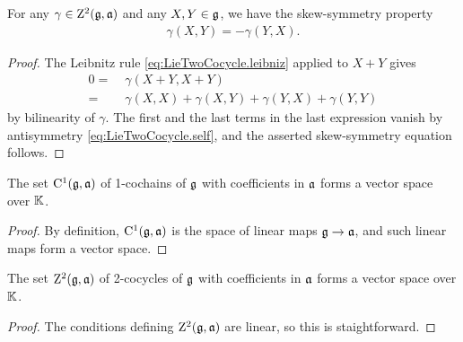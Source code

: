 \begin{lemma}
  \label{lem:LieTwoCocycle_skew_symmetry}
  \leanok
  For any $\gamma \in \mathrm{Z}^2(\mathfrak{g},\mathfrak{a})$ and any $X,Y \in \mathfrak{g}$,
  we have the skew-symmetry property
  \begin{align*}
    \gamma(X,Y) = - \gamma(Y,X) .
  \end{align*}
\end{lemma}
\begin{proof}
  \leanok
  The Leibnitz rule \eqref{eq:LieTwoCocycle.leibniz}
  applied to $X+Y$ gives
  \begin{align*}
    0 = \; & \gamma(X+Y,X+Y) \\
      = \; & \gamma(X,X) + \gamma(X,Y) + \gamma(Y,X) + \gamma(Y,Y)
  \end{align*}
  by bilinearity of $\gamma$. The first and the last terms
  in the last expression vanish by antisymmetry \eqref{eq:LieTwoCocycle.self},
  and the asserted skew-symmetry equation follows.
\end{proof}

\begin{lemma}
  \label{lem:LieOneCocycle_vectorSpace}
  \leanok
  The set $\mathrm{C}^1(\mathfrak{g}, \mathfrak{a})$ of 1-cochains of $\mathfrak{g}$ with
  coefficients in $\mathfrak{a}$ forms a vector space over $\mathbb{K}$.
\end{lemma}
\begin{proof}
  \leanok
  By definition, $\mathrm{C}^1(\mathfrak{g}, \mathfrak{a})$ is the space of
  linear maps $\mathfrak{g} \to \mathfrak{a}$, and such linear maps form
  a vector space.
\end{proof}

\begin{lemma}
  \label{lem:LieTwoCocycle_vectorSpace}
  \leanok
  The set $\mathrm{Z}^2(\mathfrak{g}, \mathfrak{a})$ of 2-cocycles of $\mathfrak{g}$ with
  coefficients in $\mathfrak{a}$ forms a vector space over $\mathbb{K}$.
\end{lemma}
\begin{proof}
  \leanok
  The conditions defining $\mathrm{Z}^2(\mathfrak{g}, \mathfrak{a})$ are linear,
  so this is staightforward.
\end{proof}

